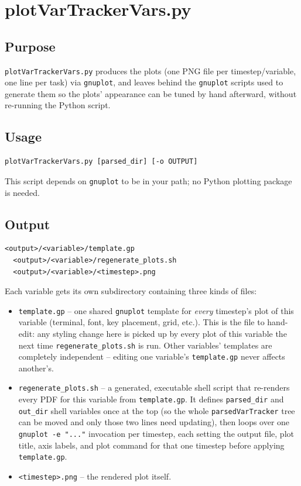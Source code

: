 \section{plotVarTrackerVars.py} \label{Section:plotVarTrackerVars}

\subsection{Purpose}
\verb|plotVarTrackerVars.py| produces the plots (one PNG file per timestep/variable, one line per
task) via \verb|gnuplot|, and leaves behind the \verb|gnuplot| scripts used to generate them
so the plots' appearance can be tuned by hand afterward, without re-running the Python script.

\subsection{Usage}
\begin{Verbatim}[fontsize=\footnotesize]
  plotVarTrackerVars.py [parsed_dir] [-o OUTPUT]
\end{Verbatim}
 This script depends on \verb|gnuplot| to be in your path; no Python plotting package is needed.

\subsection{Output}
\begin{Verbatim}[fontsize=\footnotesize]
  <output>/<variable>/template.gp
  <output>/<variable>/regenerate_plots.sh
  <output>/<variable>/<timestep>.png
\end{Verbatim}

Each variable gets its own subdirectory containing three kinds of files:

\begin{itemize}
  \item \verb|template.gp| -- one shared \verb|gnuplot| template for
    \emph{every} timestep's plot of this variable (terminal, font, key
    placement, grid, etc.). This is the file to hand-edit: any styling
    change here is picked up by every plot of this variable the next time
    \verb|regenerate_plots.sh| is run. Other variables' templates are
    completely independent -- editing one variable's \verb|template.gp|
    never affects another's.
  \item \verb|regenerate_plots.sh| -- a generated, executable shell script
    that re-renders every PDF for this variable from \verb|template.gp|.
    It defines \verb|parsed_dir| and \verb|out_dir| shell variables once
    at the top (so the whole \verb|parsedVarTracker| tree can be moved
    and only those two lines need updating), then loops over one
    \verb|gnuplot -e "..."| invocation per timestep, each setting the
    output file, plot title, axis labels, and plot command for that one
    timestep before applying \verb|template.gp|.
  \item \verb|<timestep>.png| -- the rendered plot itself.
\end{itemize}

